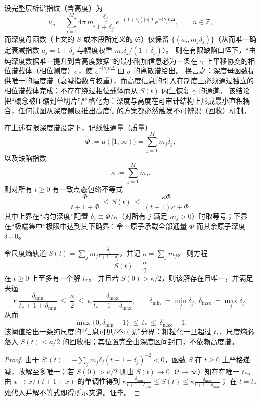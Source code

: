 \begin{proposition}\label{prop:xi-depth-height-minimal-coupling}
设完整层析谱指纹（含高度）为
\[
u_n=\sum_{j=1}^{M}4\pi\,m_j\frac{\delta_j}{1+\delta_j}\,e^{-(1+\delta_j)|n|\Delta}\,e^{-\mathrm{i}\gamma_j n\Delta},
\qquad n\in\mathbb{Z},
\]
而深度母函数（上文的 \(S\) 或本段所定义的 \(\mathfrak{S}\)）仅保留 \(\{(a_j,m_j\delta_j)\}\)（从而唯一确定衰减指数 \(a_j=1+\delta_j\) 与幅度权重 \(m_j\delta_j/(1+\delta_j)\)）。
则在有限缺陷口径下，“由纯深度数据唯一提升到含高度数据”的最小附加信息必为一条在 \(\gamma\) 上平移协变的相位谱载体（相位测度）\(\sigma\)，使 \(e^{-\mathrm{i}\gamma_j n\Delta}\) 由 \(\sigma\) 的离散谱给出。
换言之：深度母函数提供唯一的幅度谱（衰减指数与权重），而高度信息的引入在制度上必须通过独立的相位谱载体完成；不存在绕过相位载体而从 \(S(t)\) 内生恢复 \(\gamma\) 的通道。
该结论把“概念被压缩到单切片”严格化为：深度与高度在可审计结构上形成最小直积耦合，任何试图从深度侧反推出高度侧的方案都必然触发不可辨识（回收）机制。
\end{proposition}

\begin{proposition}
在上述有限深度谱设定下，记线性通量（质量）
\[
\Phi:=\mu([1,\infty))=\sum_{j=1}^{M}m_j\delta_j,
\]
以及缺陷指数
\[
\kappa:=\sum_{j=1}^{M}m_j.
\]
则对所有 \(t\ge 0\) 有一致点态包络不等式
\[
\boxed{\;
\frac{\Phi}{t+1+\Phi}\ \le\ S(t)\ \le\ \frac{\kappa\Phi}{(t+1)\kappa+\Phi}\; }.
\]
其中上界在“均匀深度”配置 \(\delta_j\equiv \Phi/\kappa\)（对所有 \(j\) 满足 \(m_j>0\)）时取等号；下界在“极端集中”极限中达到其下确界：令一原子承载全部通量 \(\Phi\) 而其余原子深度 \(\delta\downarrow 0\)。
\end{proposition}

\begin{corollary}\label{cor:xi-scale-entropy-page-threshold}
令尺度熵轨道 \(S(t)=\sum_{j}m_j\frac{\delta_j}{t+1+\delta_j}\)，并记 \(\kappa=\sum_j m_j\)。
则方程
\[
S(t)=\frac{\kappa}{2}
\]
在 \(t\ge 0\) 上至多有一个解 \(t_\ast\)。
并且若 \(S(0)>\kappa/2\)，则该解存在且唯一，并满足夹逼
\[
\kappa\,\frac{\delta_{\min}}{t_\ast+1+\delta_{\min}}
\ \le\ \frac{\kappa}{2}\ \le\
\kappa\,\frac{\delta_{\max}}{t_\ast+1+\delta_{\max}},
\qquad
\delta_{\min}:=\min_j\delta_j,\ \delta_{\max}:=\max_j\delta_j,
\]
从而
\[
\boxed{\;
\max\{0,\delta_{\min}-1\}\ \le\ t_\ast\ \le\ \delta_{\max}-1.\;}
\]
该阈值给出一条纯尺度的“信息可见/不可见”分界：粗粒化一旦超过 \(t_\ast\)，尺度熵必落入 \(S(t)\le\kappa/2\) 的回收相；其位置完全由深度区间封口，不依赖高度谱。
\end{corollary}
\begin{proof}
由于
\(
S'(t)=-\sum_j m_j\delta_j(t+1+\delta_j)^{-2}<0
\)，函数 \(S\) 在 \(t\ge0\) 上严格递减，故解至多唯一；若 \(S(0)>\kappa/2\) 则由 \(S(t)\to 0\)（\(t\to\infty\)）知存在唯一 \(t_\ast\)。
由 \(x\mapsto x/(t+1+x)\) 的单调性得到
\(
\kappa\frac{\delta_{\min}}{t+1+\delta_{\min}}\le S(t)\le \kappa\frac{\delta_{\max}}{t+1+\delta_{\max}}
\)；
在 \(t=t_\ast\) 处代入并解不等式即得所示夹逼。证毕。
\end{proof}

